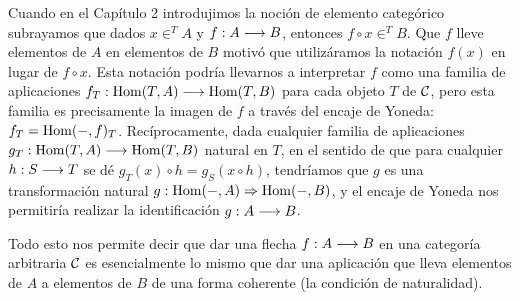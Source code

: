 Cuando en el Capítulo 2 introdujimos la noción
de elemento categórico subrayamos que dados $x \in^T A$ y
$f : A\longrightarrow B$, entonces $f \circ x \in^T B$.
Que $f$ lleve elementos de $A$ en elementos de $B$
motivó que utilizáramos la notación $f(x)$ en lugar de $f \circ x$.
Esta notación podría llevarnos a interpretar $f$ como una familia
de aplicaciones
$f_T : \operatorname{Hom}(T, A)\longrightarrow \operatorname{Hom}(T, B)$ para cada objeto $T$ de $\mathcal{C}$,
pero esta familia es precisamente
la imagen de $f$ a través del encaje de Yoneda: $f_T = \operatorname{Hom}(-, f)_T$.
Recíprocamente,
dada cualquier familia de aplicaciones
$g_T : \operatorname{Hom}(T, A)\longrightarrow \operatorname{Hom}(T, B)$ natural en $T$, en el sentido
de que para cualquier $h : S\longrightarrow T$ se dé
$g_T(x) \circ h = g_S(x \circ h)$, tendríamos que $g$ es una transformación
natural $g: \operatorname{Hom}(-, A)\Rightarrow \operatorname{Hom}(-, B)$, y el
encaje de Yoneda nos permitiría realizar la identificación $g : A\longrightarrow B$.

Todo esto nos permite decir que dar una flecha $f: A\longrightarrow B$ en una categoría
arbitraria $\mathcal{C}$ es esencialmente lo mismo que dar una aplicación que lleva
elementos de $A$ a elementos de $B$ de una forma coherente (la condición
de naturalidad).

